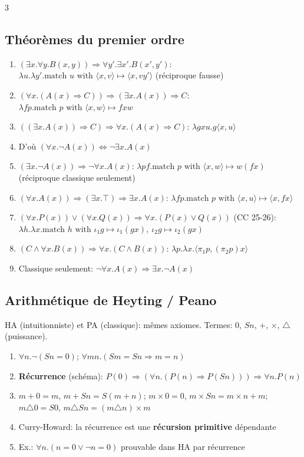 \documentclass[12pt, a4paper]{article}
\newcommand{\inj}[1]{\iota_{#1}}
\begin{document}
\begin{multicols*}{3}
	\colbreak
	\subsection{Théorèmes du premier ordre}
	\begin{enumerate}[\roman*.]
		\item $(\exists x.\forall y.B(x,y))\Rightarrow\forall y'.\exists x'.B(x',y')$:\\ $\lambda u.\lambda y'.\text{match }u\text{ with }\langle x,v\rangle\mapsto\langle x,vy'\rangle$ (réciproque fausse)
		\item $(\forall x.(A(x)\Rightarrow C))\Rightarrow(\exists x.A(x))\Rightarrow C$:\\ $\lambda fp.\text{match }p\text{ with }\langle x,w\rangle\mapsto fxw$
		\item $((\exists x.A(x))\Rightarrow C)\Rightarrow\forall x.(A(x)\Rightarrow C)$: $\lambda gxu.g\langle x,u\rangle$
		\item D'où $(\forall x.\neg A(x))\Leftrightarrow\neg\exists x.A(x)$
		\item $(\exists x.\neg A(x))\Rightarrow\neg\forall x.A(x)$: $\lambda pf.\text{match }p\text{ with }\langle x,w\rangle\mapsto w(fx)$ (réciproque classique seulement)
		\item $(\forall x.A(x))\Rightarrow(\exists x.\top)\Rightarrow\exists x.A(x)$: $\lambda fp.\text{match }p\text{ with }\langle x,u\rangle\mapsto\langle x,fx\rangle$
		\item $(\forall x.P(x))\vee(\forall x.Q(x))\Rightarrow\forall x.(P(x)\vee Q(x))$ (CC 25-26):\\ $\lambda h.\lambda x.\text{match }h\text{ with }\inj1g\mapsto\inj1(gx),\ \inj2g\mapsto\inj2(gx)$
		\item $(C\wedge\forall x.B(x))\Rightarrow\forall x.(C\wedge B(x))$: $\lambda p.\lambda x.\langle\pi_1p,(\pi_2p)x\rangle$
		\item Classique seulement: $\neg\forall x.A(x)\Rightarrow\exists x.\neg A(x)$
	\end{enumerate}

	\subsection{Arithmétique de Heyting / Peano}
	HA (intuitionniste) et PA (classique): mêmes axiomes. Termes: $0$, $Sn$, $+$, $\times$, $\triangle$ (puissance).
	\begin{enumerate}[\roman*.]
		\item $\forall n.\neg(Sn=0)$; $\forall mn.(Sm=Sn\Rightarrow m=n)$
		\item \textbf{Récurrence} (schéma): $P(0)\Rightarrow(\forall n.(P(n)\Rightarrow P(Sn)))\Rightarrow\forall n.P(n)$
		\item $m+0=m$, $m+Sn=S(m+n)$; $m\times0=0$, $m\times Sn=m\times n+m$; $m\triangle0=S0$, $m\triangle Sn=(m\triangle n)\times m$
		\item Curry-Howard: la récurrence est une \textbf{récursion primitive} dépendante
		\item Ex.: $\forall n.(n=0\vee\neg n=0)$ prouvable dans HA par récurrence
	\end{enumerate}


\end{multicols*}
\end{document}
